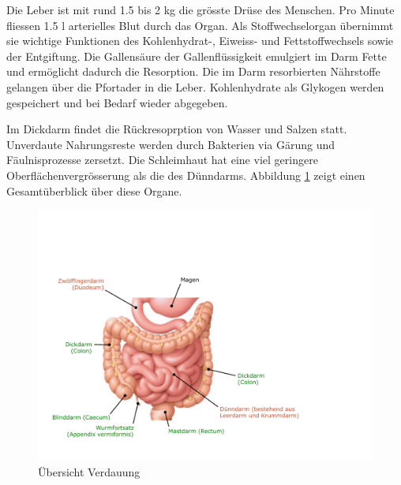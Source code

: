 Die Leber ist mit rund 1.5 bis 2 kg die grösste Drüse des Menschen. Pro Minute fliessen 1.5 l arterielles Blut durch das Organ. Als Stoffwechselorgan übernimmt sie wichtige Funktionen des Kohlenhydrat-, Eiweiss- und Fettstoffwechsels sowie der Entgiftung. Die Gallensäure der Gallenflüssigkeit emulgiert im Darm Fette und ermöglicht dadurch die Resorption. Die im Darm resorbierten Nährstoffe gelangen über die Pfortader in die Leber. Kohlenhydrate als Glykogen werden gespeichert und bei Bedarf wieder abgegeben. 

Im Dickdarm findet die Rückresoprption von Wasser und Salzen statt. Unverdaute Nahrungsreste werden durch Bakterien via Gärung und Fäulnisprozesse zersetzt. Die Schleimhaut hat eine viel geringere Oberflächenvergrösserung als die des Dünndarms. Abbildung \ref{fig:verdauung} zeigt einen Gesamtüberblick über diese Organe.

\begin{figure}
\centering
\includegraphics[width=0.7\linewidth]{fig/verdauung}
\caption{Übersicht Verdauung}
\label{fig:verdauung}
\end{figure}

\newpage

